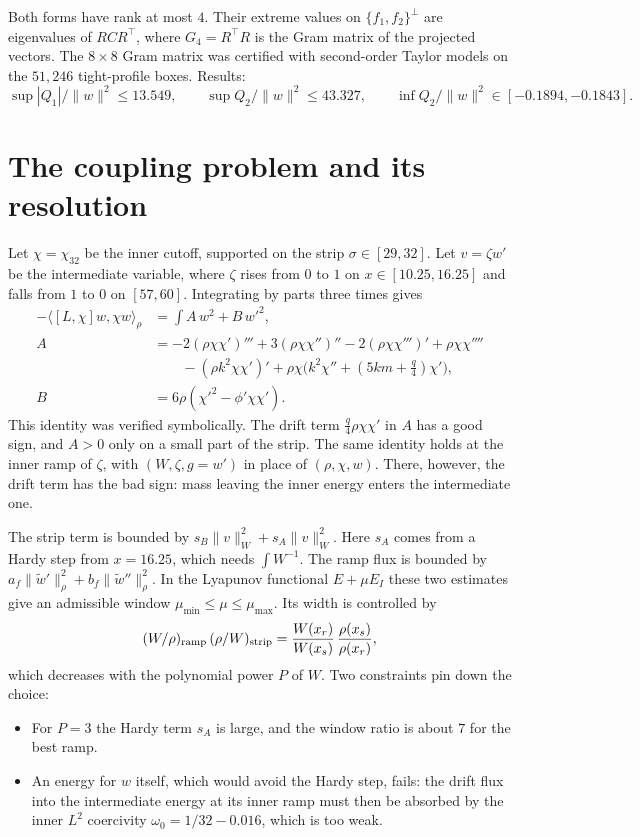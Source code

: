\documentclass[11pt]{amsart}
\theoremstyle{remark}
\newcommand{\ip}[2]{\langle #1,#2\rangle}
\begin{document}
Both forms have rank at most $4$. Their extreme values on $\{f_1,f_2\}^\perp$ are eigenvalues of $RCR^{\!\top}$, where $G_4=R^{\!\top}R$ is the Gram matrix of the projected vectors. The $8\times8$ Gram matrix was certified with second-order Taylor models on the $51{,}246$ tight-profile boxes. Results:
\[
\sup|Q_1|/\|w\|^2\le13.549,\qquad \sup Q_2/\|w\|^2\le43.327,\qquad \inf Q_2/\|w\|^2\in[-0.1894,-0.1843].
\]

\section{The coupling problem and its resolution}
Let $\chi=\chi_{32}$ be the inner cutoff, supported on the strip $\sigma\in[29,32]$. Let $v=\zeta w'$ be the intermediate variable, where $\zeta$ rises from $0$ to $1$ on $x\in[10.25,16.25]$ and falls from $1$ to $0$ on $[57,60]$. Integrating by parts three times gives
\begin{align*}
-\ip{[L,\chi]w}{\chi w}_\rho&=\int A\,w^2+B\,w'^2,\\
A&=-2(\rho\chi\chi')'''+3(\rho\chi\chi'')''-2(\rho\chi\chi''')'+\rho\chi\chi''''\\
&\qquad-(\rho k^2\chi\chi')'+\rho\chi\big(k^2\chi''+(5km+\tfrac q4)\chi'\big),\\
B&=6\rho(\chi'^2-\phi'\chi\chi').
\end{align*}
This identity was verified symbolically. The drift term $\frac q4\rho\chi\chi'$ in $A$ has a good sign, and $A>0$ only on a small part of the strip. The same identity holds at the inner ramp of $\zeta$, with $(W,\zeta,g=w')$ in place of $(\rho,\chi,w)$. There, however, the drift term has the bad sign: mass leaving the inner energy enters the intermediate one.

The strip term is bounded by $s_B\|v\|_W^2+s_A\|v\|_W^2$. Here $s_A$ comes from a Hardy step from $x=16.25$, which needs $\int W^{-1}$. The ramp flux is bounded by $a_f\|\tilde w'\|_\rho^2+b_f\|\tilde w''\|_\rho^2$. In the Lyapunov functional $E+\mu E_I$ these two estimates give an admissible window $\mu_{\min}\le\mu\le\mu_{\max}$. Its width is controlled by
\[
(W/\rho)_{\rm ramp}\,(\rho/W)_{\rm strip}=\frac{W(x_r)}{W(x_s)}\,\frac{\rho(x_s)}{\rho(x_r)},
\]
which decreases with the polynomial power $P$ of $W$. Two constraints pin down the choice:
\begin{itemize}
\item For $P=3$ the Hardy term $s_A$ is large, and the window ratio is about $7$ for the best ramp.
\item An energy for $w$ itself, which would avoid the Hardy step, fails: the drift flux into the intermediate energy at its inner ramp must then be absorbed by the inner $L^2$ coercivity $\omega_0=1/32-0.016$, which is too weak.
\end{itemize}
\end{document}
